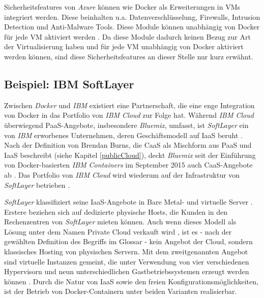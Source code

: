 \documentclass[../main.tex]{subfiles}
\begin{document}
      Sicherheitsfeatures von \emph{Azure} können wie Docker als Erweiterungen in VMs integriert werden. Diese beinhalten u.a. Datenverschlüsselung, Firewalls, Intrusion Detection und Anti-Malware Tools. Diese Module können unabhängig von Docker für jede VM aktiviert werden \cite{azureDockerExtensionSecurity}. Da diese Module dadurch keinen Bezug zur Art der Virtualisierung haben und für jede VM unabhängig von Docker aktiviert werden können, sind diese Sicherheitsfeatures an dieser Stelle nur kurz erwähnt.

    \subsection{Beispiel: IBM SoftLayer}
    \label{softlayer}
      Zwischen \emph{Docker} und \emph{IBM} existiert eine Partnerschaft, die eine enge Integration von Docker in das Portfolio von \emph{IBM Cloud} zur Folge hat. Während \emph{IBM Cloud} überwiegend PaaS-Angebote, insbesondere \emph{Bluemix}, umfasst, ist \emph{SoftLayer} ein von \emph{IBM} erworbenes Unternehmen, deren Geschäftsmodell auf IaaS beruht \cite{IBMDockerServices}. Nach der Definition von Brendan Burns, die CaaS als Mischform aus PaaS und IaaS beschreibt (siehe Kapitel \ref{publicCloud}), deckt \emph{Bluemix} seit der Einführung von Docker-basierten \emph{IBM Containers} im September 2015 auch CaaS-Angebote ab \cite{IBMContainerLaunch}. Das Portfolio von \emph{IBM Cloud} wird wiederum auf der Infrastruktur von \emph{SoftLayer} betrieben \cite{IBMPartnershipDocker}.

      \emph{SoftLayer} klassifiziert seine IaaS-Angebote in \glqq{}Bare Metal\grqq{}- und virtuelle Server . Erstere beziehen sich auf dedizierte physische Hosts, die Kunden in den Rechenzentren von \emph{SoftLayer} mieten können. Auch wenn dieses Modell als Lösung unter dem Namen \glqq{}Private Cloud\grqq{} verkauft wird \cite{softlayerPrivateCloud}, ist es - nach der gewählten Definition des Begriffs im Glossar - kein Angebot der Cloud, sondern klassisches Hosting von physischen Servern.
      Mit dem zweitgenannten Angebot sind virtuelle Instanzen gemeint, die unter Verwendung von vier verschiedenen Hypervisorn und neun unterschiedlichen Gastbetriebssystemen erzeugt werden können \cite{softlayerSoftware}. Durch die Natur von IaaS sowie den freien Konfigurationsmöglichkeiten, ist der Betrieb von Docker-Containern unter beiden Varianten realisierbar.
\end{document}
